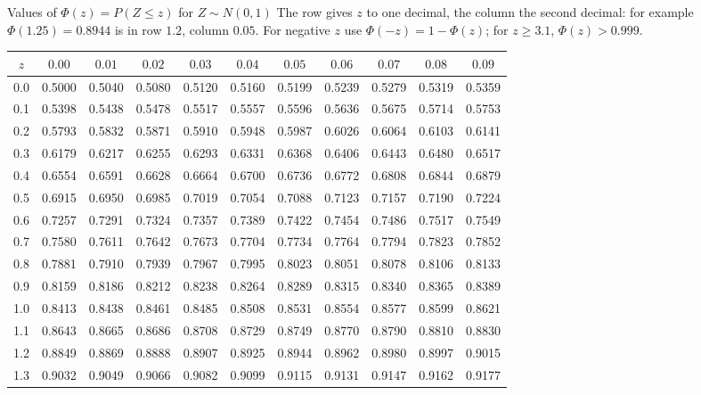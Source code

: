 \begin{key}{Values of $\Phi(z)=P(Z\le z)$ for $Z\sim N(0,1)$}
	The row gives $z$ to one decimal, the column the second decimal: for
	example $\Phi(1.25)=0.8944$ is in row $1.2$, column $0.05$. For negative
	$z$ use $\Phi(-z)=1-\Phi(z)$; for $z\ge3.1$, $\Phi(z)>0.999$.
	\begin{center}
		\small
		\renewcommand{\arraystretch}{1.02}
		\setlength{\tabcolsep}{3.6pt}
		\begin{tabular}{@{}c|cccccccccc@{}}
			\toprule
			$z$ & $0.00$ & $0.01$ & $0.02$ & $0.03$ & $0.04$ & $0.05$ & $0.06$ & $0.07$ & $0.08$ & $0.09$ \\\midrule
			0.0 & 0.5000 & 0.5040 & 0.5080 & 0.5120 & 0.5160 & 0.5199 & 0.5239 & 0.5279 & 0.5319 & 0.5359 \\
			0.1 & 0.5398 & 0.5438 & 0.5478 & 0.5517 & 0.5557 & 0.5596 & 0.5636 & 0.5675 & 0.5714 & 0.5753 \\
			0.2 & 0.5793 & 0.5832 & 0.5871 & 0.5910 & 0.5948 & 0.5987 & 0.6026 & 0.6064 & 0.6103 & 0.6141 \\
			0.3 & 0.6179 & 0.6217 & 0.6255 & 0.6293 & 0.6331 & 0.6368 & 0.6406 & 0.6443 & 0.6480 & 0.6517 \\
			0.4 & 0.6554 & 0.6591 & 0.6628 & 0.6664 & 0.6700 & 0.6736 & 0.6772 & 0.6808 & 0.6844 & 0.6879 \\
			0.5 & 0.6915 & 0.6950 & 0.6985 & 0.7019 & 0.7054 & 0.7088 & 0.7123 & 0.7157 & 0.7190 & 0.7224 \\
			0.6 & 0.7257 & 0.7291 & 0.7324 & 0.7357 & 0.7389 & 0.7422 & 0.7454 & 0.7486 & 0.7517 & 0.7549 \\
			0.7 & 0.7580 & 0.7611 & 0.7642 & 0.7673 & 0.7704 & 0.7734 & 0.7764 & 0.7794 & 0.7823 & 0.7852 \\
			0.8 & 0.7881 & 0.7910 & 0.7939 & 0.7967 & 0.7995 & 0.8023 & 0.8051 & 0.8078 & 0.8106 & 0.8133 \\
			0.9 & 0.8159 & 0.8186 & 0.8212 & 0.8238 & 0.8264 & 0.8289 & 0.8315 & 0.8340 & 0.8365 & 0.8389 \\
			1.0 & 0.8413 & 0.8438 & 0.8461 & 0.8485 & 0.8508 & 0.8531 & 0.8554 & 0.8577 & 0.8599 & 0.8621 \\
			1.1 & 0.8643 & 0.8665 & 0.8686 & 0.8708 & 0.8729 & 0.8749 & 0.8770 & 0.8790 & 0.8810 & 0.8830 \\
			1.2 & 0.8849 & 0.8869 & 0.8888 & 0.8907 & 0.8925 & 0.8944 & 0.8962 & 0.8980 & 0.8997 & 0.9015 \\
			1.3 & 0.9032 & 0.9049 & 0.9066 & 0.9082 & 0.9099 & 0.9115 & 0.9131 & 0.9147 & 0.9162 & 0.9177 \\

\end{tabular}
\end{center}
\end{key}
